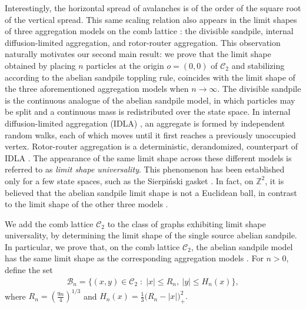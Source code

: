 \documentclass[11pt]{article}
\begin{document}
Interestingly, the horizontal spread of avalanches is of the order of the square root of the vertical spread. This same scaling relation also appears in the limit shapes of three aggregation models on the comb lattice \cite{IDLA-comb-2012}: the divisible sandpile, internal diffusion-limited aggregation, and rotor-router aggregation.
This observation naturally motivates our second main result: we prove that the limit shape obtained by placing $n$ particles at the origin $o=(0,0)$ of $\mathcal{C}_2$ and stabilizing according to the abelian sandpile toppling rule,
coincides with the limit shape of the three aforementioned aggregation models when $n\to\infty$.
The divisible sandpile \cite{LP09} is the continuous analogue of the abelian sandpile model, in which particles may be split and a continuous mass is redistributed over the state space. In internal diffusion-limited aggregation (IDLA) \cite{DF90}, an aggregate is formed by independent random walks, each of which moves until it first reaches a previously unoccupied vertex. Rotor-router aggregation is a deterministic, derandomized, counterpart of IDLA \cite{PDDK96}.
The appearance of the same limit shape across these different models is referred to as \emph{limit shape universality}. This phenomenon has been established only for a few state spaces, such as the Sierpiński gasket \cite{CK20,FHKS24,Div-sand-gasket-2019,IDLA-gasket-2020}. In fact, on $\mathbb{Z}^2$, it is believed that the abelian sandpile limit shape is not a Euclidean ball, in contrast to the limit shape of the other three models \cite{Rotor-Zd-Levine-Peres-2008,LP09,Levine-Peres-2017-survey}. 

We add the comb lattice $\mathcal{C}_2$ to the class of graphs exhibiting limit shape universality, by determining the limit shape of the single source abelian sandpile. In particular, we prove that, on the comb lattice $\mathcal{C}_2$, the abelian sandpile model has the same limit shape as the corresponding aggregation models \cite{IDLA-comb-2012}.
For $n>0$, define the set
\begin{align}\tag{LS}\label{eq:Bm}
\mathcal B_n= \big\{(x,y)\in\mathcal{C}_2\;:\;|x|\le R_n,
    \ |y|\le H_n(x)
  \big\},
\end{align}
where
$R_n=\left(\frac{9n}{4}\right)^{1/3}$ and $H_n(x)=\frac13\bigl(R_n-|x|\bigr)_+^2.$
\end{document}
